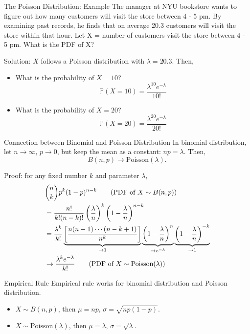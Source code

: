\documentclass{beamer}
\newcommand{\pr}{\mathbb{P}}
\begin{document}
\begin{frame}{The Poisson Distribution: Example}
\small
The manager at NYU bookstore wants to figure out how many customers will visit the store between 4 - 5 pm.
By examining past records, he finds that on average 20.3 customers will visit the store within that hour.
Let X = number of customers visit the store between 4 - 5 pm. What is the PDF of X? 

Solution: $X$ follows a Poisson distribution with $\lambda=20.3$. Then,
\begin{itemize}
\item What is the probability of $X=10$?
$$\pr(X=10)=\frac{\lambda^{10} e^{-\lambda}}{10!}$$
\item What is the probability of $X=20$?
$$\pr(X=20)=\frac{\lambda^{20} e^{-\lambda}}{20!}$$
\end{itemize}
\end{frame}

\begin{frame}{Connection between Binomial and Poisson Distribution}
In binomial distribution, let $n\to \infty$, $p\to 0$, but keep the mean as a constant: $np=\lambda$.
Then,
$$ B(n,p) \to \text{Poisson}(\lambda).$$

Proof: for any fixed number $k$ and parameter $\lambda$,
\small
\begin{align*}
& \binom{n}{k} p^k (1-p)^{n-k} \tag{PDF of $X\sim B(n,p)$}\\
&= \frac{n!}{k! (n-k)!} \left(\frac{\lambda}{n}\right)^k \left(1-\frac{\lambda}{n}\right)^{n-k}  \\
    &= \frac{\lambda^k}{k!} \underbrace{\left[\frac{n(n-1)\cdots (n-k+1)}{n^k}\right]}_{\to 1}
    \underbrace{\left(1-\frac{\lambda}{n}\right)^{n}}_{\to e^{-\lambda}}
    \underbrace{\left(1-\frac{\lambda}{n}\right)^{-k}}_{\to 1}\\
    & \to \frac{\lambda^k e^{-\lambda}}{k!}   \tag{PDF of $X \sim \text{Poisson}(\lambda)$}
\end{align*}
\end{frame}

\begin{frame}{Empirical Rule}
Empirical rule works for binomial distribution and Poisson distribution.
\begin{itemize}
\item $X\sim B(n,p)$, then $\mu=np$, $\sigma=\sqrt{np(1-p)}$.
\item $X\sim \text{Poisson}(\lambda)$, then $\mu=\lambda$, $\sigma=\sqrt{\lambda}$.
\end{itemize}
\end{frame}
\end{document}
